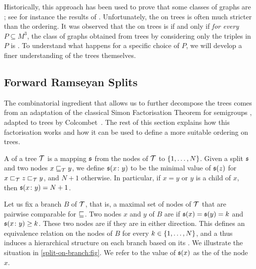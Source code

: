 \AP Historically, this approach has been used to prove that some classes of
graphs are ; see for instance the results of
\cite{DING92,DRT10}. Unfortunately, the  on trees is
often much stricter than the  ordering. It was observed
that the  on trees is  if and
only if \emph{for every} $P \subseteq M^3$, the class of graphs obtained from
trees by considering only the triples in $P$ is
 \cite[Theorem 24]{LOPEZ24}. To understand
what happens for a specific choice of $P$, we will develop a finer
understanding of the trees themselves.


\subsection{Forward Ramseyan Splits}

\def\t{\aTree} \AP The combinatorial ingredient that allows us to further
decompose the trees comes from an adaptation of the classical Simon
Factorisation Theorem for semigroups \cite{SIMO90}, adapted to trees by
Colcombet~\cite{COLC07}. The rest of this section explains how this
factorisation works and how it can be used to define a more suitable ordering
on trees.

\AP A  of a tree $\aTree$ is a mapping $\mathfrak{s}$ from
the nodes of $\aTree$ to $\{ 1, \dots, N \}$. Given a split $\mathfrak{s}$ and two
nodes $x \treeleq[\t] y$, we define $\mathfrak{s}(x \colon y)$ to be the minimal value
of $\mathfrak{s}(z)$ for $x \treelt[\t] z \treelt[\t] y$, and $N+1$ otherwise. In
particular, if $x=y$ or $y$ is a child of $x$, then $\mathfrak{s}(x \colon y) = N+1$.


\AP Let us fix a branch $B$ of $\aTree$, that is, a maximal set of nodes
of $\aTree$ that are pairwise comparable for $\treeleq$. Two nodes $x$ and
$y$ of $B$ are  if $\mathfrak{s}(x) = \mathfrak{s}(y) = k$
and $\mathfrak{s}(x \colon y) \geq k$. These two nodes are 
if they are  in either direction. This
defines an equivalence relation on the nodes of $B$ for every $k \in
\{ 1, \dots, N \}$, and a  thus induces a hierarchical structure
on each branch based on its . We illustrate the
situation in \cref{split-on-branch:fig}. We refer to the value of
$\mathfrak{s}(x)$ as the  of the node $x$.


